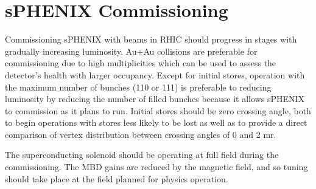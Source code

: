 \chapter{sPHENIX Commissioning}
\label{chap:commissioning}

Commissioning sPHENIX with beams in RHIC should progress in stages with gradually
increasing luminosity.  Au+Au collisions are preferable for  commissioning due
to high multiplicities which can be used to assess the detector's health with 
larger occupancy.  Except for initial stores, operation with the maximum number of 
bunches (110 or 111) is preferable to reducing luminosity by reducing the number of
filled bunches because it allows sPHENIX to commission as it plans to run.  Initial 
stores should be zero crossing angle, both to begin operations with stores less likely to
be lost as well as to provide a direct comparison of vertex distribution between crossing angles
of 0 and 2 mr.

The superconducting solenoid should be operating at full field during the commissioning.
The MBD gains are reduced by the magnetic field, and so tuning should take place
at the field planned for physics operation.

